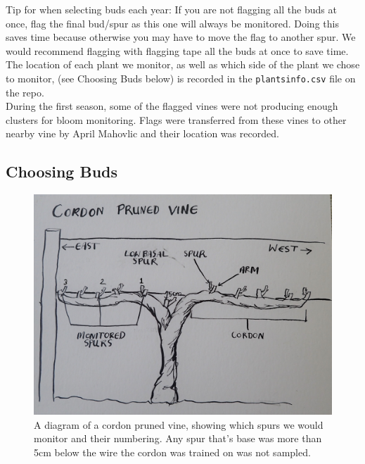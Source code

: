\documentclass[11pt,letter]{article}
\begin{document}
Tip for when selecting buds each year: If you are not flagging all the buds at once, flag the final bud/spur as this one will always be monitored. Doing this saves time because otherwise you may have to move the flag to another spur. We would recommend flagging with flagging tape all the buds at once to save time.\\

The location of each plant we monitor, as well as which side of the plant we chose to monitor, (see Choosing Buds below) is recorded in the \verb|plantsinfo.csv| file on the repo. \\

During the first season, some of the flagged vines were not producing enough clusters for bloom monitoring. Flags were transferred from these vines to other nearby vine by April Mahovlic and their location was recorded.

\subsection{Choosing Buds}


\begin{figure}
  \includegraphics[width=\linewidth]{CordonPruned.jpg}
  \caption{A diagram of a cordon pruned vine, showing which spurs we would monitor and their numbering. Any spur that's base was more than 5cm below the wire the cordon was trained on was not sampled.}
  \label{fig:CordonPruned}
\end{figure}
\end{document}
